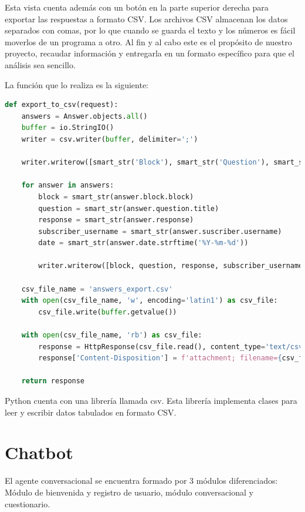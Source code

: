 Esta vista cuenta además con un botón en la parte superior derecha para exportar las respuestas a formato CSV. Los archivos CSV almacenan los datos separados con comas, por lo que cuando se guarda el texto y los números es fácil moverlos de un programa a otro. Al fin y al cabo este es el propósito de nuestro proyecto, recaudar información y entregarla en un formato específico para que el análisis sea sencillo.

La función que lo realiza es la siguiente:

\begin{lstlisting}[language=Python]
def export_to_csv(request):
    answers = Answer.objects.all()
    buffer = io.StringIO()
    writer = csv.writer(buffer, delimiter=';')

    writer.writerow([smart_str('Block'), smart_str('Question'), smart_str('Response'), smart_str('Subscriber'), smart_str('Date')])
    
    for answer in answers:
        block = smart_str(answer.block.block)
        question = smart_str(answer.question.title)
        response = smart_str(answer.response)
        subscriber_username = smart_str(answer.suscriber.username)
        date = smart_str(answer.date.strftime('%Y-%m-%d'))

        writer.writerow([block, question, response, subscriber_username, date])
    
    csv_file_name = 'answers_export.csv'
    with open(csv_file_name, 'w', encoding='latin1') as csv_file:
        csv_file.write(buffer.getvalue())
    
    with open(csv_file_name, 'rb') as csv_file:
        response = HttpResponse(csv_file.read(), content_type='text/csv')
        response['Content-Disposition'] = f'attachment; filename={csv_file_name}'
    
    return response
\end{lstlisting}

Python cuenta con una librería llamada csv. Esta librería implementa clases para leer y escribir datos tabulados en formato CSV.\vspace{0.5cm}


\section{Chatbot}


El agente conversacional se encuentra formado por 3 módulos diferenciados: Módulo de bienvenida y registro de usuario, módulo conversacional y cuestionario.


